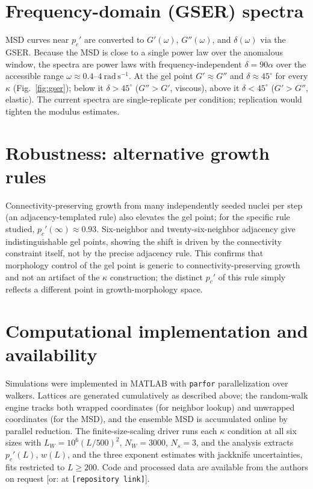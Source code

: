 \documentclass[aps,prl,twocolumn,superscriptaddress,floatfix,nofootinbib]{revtex4-2}
\newcommand{\pcp}{p_c'}
\newcommand{\kap}{\kappa}
\begin{document}
\section{Frequency-domain (GSER) spectra}
MSD curves near $\pcp$ are converted to $G'(\omega)$, $G''(\omega)$, and $\delta(\omega)$ via the
GSER. Because the MSD is close to a single power law over the anomalous window, the spectra are
power laws with frequency-independent $\delta=90\alpha$ over the accessible range
$\omega\approx0.4$--$4~\mathrm{rad\,s^{-1}}$. At the gel point $G'\approx G''$ and
$\delta\approx45^{\circ}$ for every $\kap$ (Fig.~\ref{fig:gser}); below it $\delta>45^{\circ}$
($G''>G'$, viscous), above it $\delta<45^{\circ}$ ($G'>G''$, elastic). The current spectra are
single-replicate per condition; replication would tighten the modulus estimates.

\section{Robustness: alternative growth rules}
Connectivity-preserving growth from many independently seeded nuclei per step (an
adjacency-templated rule) also elevates the gel point; for the specific rule studied,
$\pcp(\infty)\approx0.93$. Six-neighbor and twenty-six-neighbor adjacency give indistinguishable gel
points, showing the shift is driven by the connectivity constraint itself, not by the precise
adjacency rule. This confirms that morphology control of the gel point is generic to
connectivity-preserving growth and not an artifact of the $\kap$ construction; the distinct $\pcp$
of this rule simply reflects a different point in growth-morphology space.

\section{Computational implementation and availability}
Simulations were implemented in MATLAB with \texttt{parfor} parallelization over walkers. Lattices
are generated cumulatively as described above; the random-walk engine tracks both wrapped
coordinates (for neighbor lookup) and unwrapped coordinates (for the MSD), and the ensemble MSD is
accumulated online by parallel reduction. The finite-size-scaling driver runs each $\kap$ condition
at all six sizes with $L_W=10^6(L/500)^2$, $N_W=3000$, $N_s=3$, and the analysis extracts $\pcp(L)$,
$w(L)$, and the three exponent estimates with jackknife uncertainties, fits restricted to $L\ge200$.
Code and processed data are available from the authors on request [or: at \texttt{[repository link]}].
\end{document}
